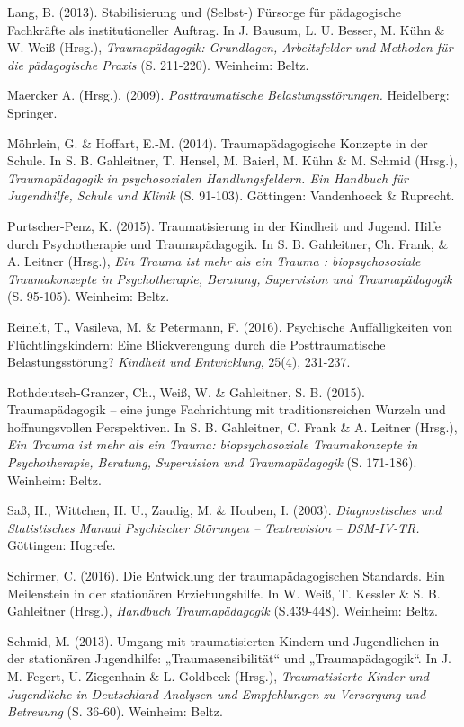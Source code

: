 \hang
Lang, B. (2013). Stabilisierung und (Selbst-) F{\"u}rsorge f{\"u}r p{\"a}dagogische Fachkr{\"a}fte als institutioneller Auftrag. In J. Bausum, L. U. Besser, M. Kühn \& W. Weiß (Hrsg.), \textit{Traumapädagogik: Grundlagen, Arbeitsfelder und Methoden für die pädagogische Praxis} (S. 211-220). Weinheim: Beltz.

\hang
Maercker A. (Hrsg.). (2009). \textit{Posttraumatische Belastungsst{\"o}rungen.} Heidelberg: Springer.

\hang
M{\"o}hrlein, G. \& Hoffart, E.-M. (2014). Traumap{\"a}dagogische Konzepte in der Schule. In S. B. Gahleitner, T. Hensel, M. Baierl, M. K{\"u}hn \& M. Schmid (Hrsg.), \textit{Traumap{\"a}dagogik in psychosozialen Handlungsfeldern. Ein Handbuch f{\"u}r Jugendhilfe, Schule und Klinik} (S. 91-103). Göttingen: Vandenhoeck \& Ruprecht.

\hang
Purtscher-Penz, K. (2015). Traumatisierung in der Kindheit und Jugend. Hilfe durch Psychotherapie und Traumap{\"a}dagogik. In S. B. Gahleitner, Ch. Frank, \& A. Leitner (Hrsg.), \textit{Ein Trauma ist mehr als ein Trauma : biopsychosoziale Traumakonzepte in Psychotherapie, Beratung, Supervision und Traumap{\"a}dagogik} (S. 95-105). Weinheim: Beltz.

\hang
Reinelt, T., Vasileva, M. \& Petermann, F. (2016). Psychische Auff{\"a}lligkeiten von Fl{\"u}chtlingskindern: Eine Blickverengung durch die Posttraumatische Belastungsst{\"o}rung? \textit{Kindheit und Entwicklung}, 25(4), 231-237.

\hang
Rothdeutsch-Granzer, Ch., Weiß, W. \& Gahleitner, S. B. (2015). Traumap{\"a}dagogik – eine junge Fachrichtung mit traditionsreichen Wurzeln und hoffnungsvollen Perspektiven. In S. B. Gahleitner, C. Frank \& A. Leitner (Hrsg.), \textit{Ein Trauma ist mehr als ein Trauma: biopsychosoziale Traumakonzepte in Psychotherapie, Beratung, Supervision und Traumap{\"a}dagogik} (S. 171-186). Weinheim: Beltz.

\hang
Saß, H., Wittchen, H. U., Zaudig, M. \& Houben, I. (2003). \textit{Diagnostisches und Statistisches Manual Psychischer Störungen – Textrevision – DSM-IV-TR.} Göttingen: Hogrefe.

\hang
Schirmer, C. (2016). Die Entwicklung der traumapädagogischen Standards. Ein Meilenstein in der stationären Erziehungshilfe. In W. Weiß, T. Kessler \& S. B. Gahleitner (Hrsg.), \textit{Handbuch Traumapädagogik} (S.439-448). Weinheim: Beltz.

\hang
Schmid, M. (2013). Umgang mit traumatisierten Kindern und Jugendlichen in der station{\"a}ren Jugendhilfe: „Traumasensibilit{\"a}t“ und „Traumap{\"a}dagogik“. In J. M. Fegert, U. Ziegenhain \& L. Goldbeck (Hrsg.), \textit{Traumatisierte Kinder und Jugendliche in Deutschland Analysen und Empfehlungen zu Versorgung und Betreuung} (S. 36-60). Weinheim: Beltz.


